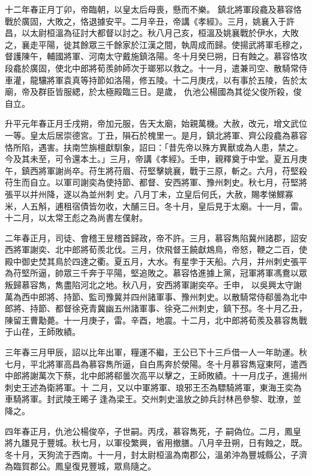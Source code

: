 \begin{pinyinscope}
 十二年春正月丁卯，帝臨朝，以皇太后母喪，懸而不樂。
 鎮北將軍段龕及慕容恪戰於廣固，大敗之，恪退據安平。二月辛丑，帝講《孝經》。三月，姚襄入于許昌，以太尉桓溫為征討大都督以討之。秋八月己亥，桓溫及姚襄戰於伊水，大敗之，襄走平陽，徙其餘眾三千餘家於江漢之間，執周成而歸。使揚武將軍毛穆之，督護陳午，輔國將軍、河南太守戴施鎮洛陽。冬十月癸巳朔，日有蝕之。慕容恪攻段龕於廣固，使北中郎將荀羨帥師次于瑯邪以救之。十一月，遣兼司空、散騎常侍車灌，龍驤將軍袁真等持節如洛陽，修五陵。十二月庚戌，以有事於五陵，告於太廟，帝及群臣皆服緦，於太極殿臨三日。是歲，
 仇池公楊國為其從父俊所殺，俊自立。



 升平元年春正月壬戌朔，帝加元服，告天太廟，始親萬機。大赦，改元，增文武位一等。皇太后居崇德宮。丁丑，隕石於槐里一。是月，鎮北將軍、齊公段龕為慕容恪所陷，遇害。扶南竺旃檀獻馴象，詔曰：「昔先帝以殊方異獸或為人患，禁之。今及其未至，可令還本土。」三月，帝講《孝經》。壬申，親釋奠于中堂。夏五月庚午，鎮西將軍謝尚卒。苻生將苻眉、苻堅擊姚襄，戰于三原，斬之。六月，苻堅殺苻生而自立。以軍司謝奕為使持節、都督、安西將軍、豫州刺史。秋七月，苻堅將張平以并州降，遂以為並州刺
 史。八月丁未，立皇后何氏，大赦，賜孝悌鰥寡米，人五斛，逋租宿債皆勿收，大酺三日。冬十月，皇后見于太廟。十一月，雷。十二月，以太常王彪之為尚書左僕射。



 二年春正月，司徒、會稽王昱稽首歸政，帝不許。三月，慕容雋陷冀州諸郡，詔安西將軍謝奕、北中郎將荀羨北伐。三月，佽飛督王饒獻鴆鳥，帝怒，鞭之二百，使殿中御史焚其鳥於四達之衢。夏五月，大水。有星孛于天船。六月，并州刺史張平為苻堅所逼，帥眾三千奔于平陽，堅追敗之。慕容恪進據上黨，冠軍將軍馮鴦以眾叛歸慕容雋，雋盡陷河北之地。秋八月，安西將軍謝奕卒。壬申，
 以吳興太守謝萬為西中郎將、持節、監司豫冀并四州諸軍事、豫州刺史。以散騎常侍郗曇為北中郎將、持節、都督徐兗青冀幽五州諸軍事、徐兗二州刺史，鎮下邳。冬十月乙丑，陳留王曹勱薨。十一月庚子，雷。辛酉，地震。十二月，北中郎將荀羨及慕容雋戰于山荏，王師敗績。



 三年春三月甲辰，詔以比年出軍，糧運不繼，王公已下十三戶借一人一年助運。秋七月，平北將軍高昌為慕容雋所逼，自白馬奔於滎陽。冬十月慕容雋寇東阿，遣西中郎將謝萬次下蔡，北中郎將郗曇次高平以擊之，王師敗績。十一月戊子，進揚州刺史王述為衛將軍。十
 二月，又以中軍將軍、琅邪王丕為驃騎將軍，東海王奕為車騎將軍。封武陵王晞子逢為梁王。交州刺史溫放之帥兵討林邑參黎、耽潦，並降之。



 四年春正月，仇池公楊俊卒，子世嗣。丙戌，慕容雋死，子嗣偽位。二月，鳳皇將九雛見于豐城。秋七月，以軍役繁興，省用撤膳。八月辛丑朔，日有蝕之，既。冬十月，天狗流于西南。十一月，封太尉桓溫為南郡公，溫弟沖為豐城縣公，子濟為臨賀郡公。鳳皇復見豐城，眾鳥隨之。




\end{pinyinscope}
